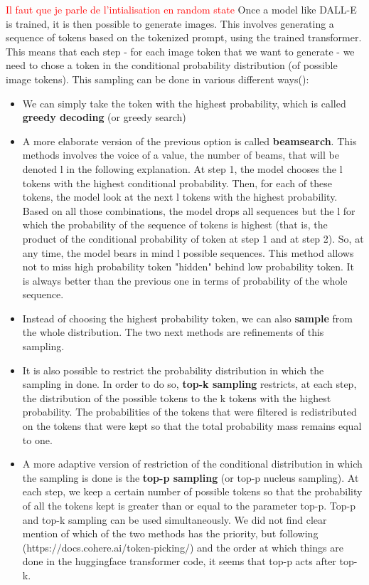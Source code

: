 \documentclass{article}
\begin{document}
\textcolor{red}{Il faut que je parle de l'intialisation en random state}
Once a model like DALL-E is trained, it is then possible to generate images. This involves generating a sequence of tokens based on the tokenized prompt, using the trained transformer. This means that each step - for each image token that we want to generate - we need to chose a token in the conditional probability distribution (of possible image tokens). \hypertarget{options-generation}{This sampling can be done in various different ways}(\cite{howtogen}):
\begin{itemize}
    \item We can simply take the token with the highest probability, which is called \textbf{greedy decoding} (or greedy search)
    \item A more elaborate version of the previous option is called \textbf{beamsearch}. This methods involves the voice of a value, the number of beams, that will be denoted l in the following explanation. At step 1, the model chooses the l tokens with the highest conditional probability. Then, for each of these tokens, the model look at the next l tokens with the highest probability. Based on all those combinations, the model drops all sequences but the l for which the probability of the sequence of tokens is highest (that is, the product of the conditional probability of token at step 1 and at step 2). So, at any time, the model bears in mind l possible sequences. This method allows not to miss high probability token "hidden" behind low probability token. It is always better than the previous one in terms of probability of the whole sequence. 
    \item Instead of choosing the highest probability token, we can also \textbf{sample} from the whole distribution. The two next methods are refinements of this sampling. 
    \item It is also possible to restrict the probability distribution in which the sampling in done. In order to do so, \textbf{top-k sampling} restricts, at each step, the distribution of the possible tokens to the k tokens with the highest probability. The probabilities of the tokens that were filtered is redistributed on the tokens that were kept so that the total probability mass remains equal to one. 
    \item A more adaptive version of restriction of the conditional distribution in which the sampling is done is the \textbf{top-p sampling} (or top-p nucleus sampling). At each step, we keep a certain number of possible tokens so that the probability of all the tokens kept is greater than or equal to the parameter top-p. Top-p and top-k sampling can be used simultaneously. We did not find clear mention of which of the two methods has the priority, but following (https://docs.cohere.ai/token-picking/) and the order at which things are done in the huggingface transformer code, it seems that top-p acts after top-k. 
\end{itemize}
\end{document}

